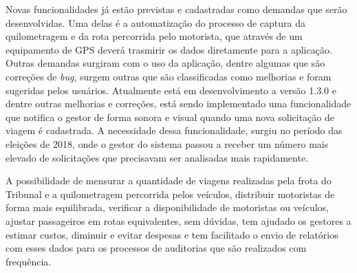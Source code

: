 Novas funcionalidades já estão previstas e cadastradas como demandas que serão desenvolvidas. Uma delas é a automatização do processo de captura da quilometragem e da rota percorrida pelo motorista, que através de um equipamento de GPS deverá trasmirir os dados diretamente para a aplicação. Outras demandas surgiram com o uso da aplicação, dentre algumas que são correções de \textit{bug}, surgem outras que são classificadas como melhorias e foram sugeridas pelos usuários. Atualmente está em desenvolvimento a versão 1.3.0 e dentre outras melhorias e correções, está sendo implementado uma funcionalidade que notifica o gestor de forma sonora e visual quando uma nova solicitação de viagem é cadastrada. A necessidade dessa funcionalidade, surgiu no período das eleições de 2018, onde o gestor do sistema passou a receber um número mais elevado de solicitações que precisavam ser analisadas mais rapidamente.

A possibilidade de mensurar a quantidade de viagens realizadas pela frota do Tribunal e a quilometragem percorrida pelos veículos, distribuir motoristas de forma mais equilibrada, verificar a disponibilidade de motoristas ou veículos, ajustar passageiros em rotas equivalentes, sem dúvidas, tem ajudado os gestores a estimar custos, diminuir e evitar despesas e tem facilitado o envio de relatórios com esses dados para os processos de auditorias que são realizados com frequência.